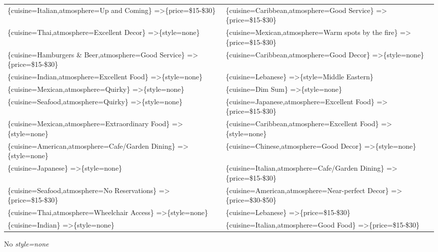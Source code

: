 \documentclass[letterpaper,10pt]{article}
\begin{document}
\begin{appendices}
\begin{table}[h]
\begin{adjustbox}{max width=\textwidth}
\begin{tabular}{ll}
\{cuisine=Italian,atmosphere=Up and Coming\} =\textgreater \{price=\$15-\$30\} & \{cuisine=Caribbean,atmosphere=Good Service\} =\textgreater \{price=\$15-\$30\} \\ 
\{cuisine=Thai,atmosphere=Excellent Decor\} =\textgreater \{style=none\} & \{cuisine=Mexican,atmosphere=Warm spots by the fire\} =\textgreater \{price=\$15-\$30\} \\ 
\{cuisine=Hamburgers \& Beer,atmosphere=Good Service\} =\textgreater \{price=\$15-\$30\} & \{cuisine=Caribbean,atmosphere=Good Decor\} =\textgreater \{style=none\} \\ 
\{cuisine=Indian,atmosphere=Excellent Food\} =\textgreater \{style=none\} & \{cuisine=Lebanese\} =\textgreater \{style=Middle Eastern\} \\ 
\{cuisine=Mexican,atmosphere=Quirky\} =\textgreater \{style=none\} & \{cuisine=Dim Sum\} =\textgreater \{style=none\} \\ 
\{cuisine=Seafood,atmosphere=Quirky\} =\textgreater \{style=none\} & \{cuisine=Japanese,atmosphere=Excellent Food\} =\textgreater \{price=\$15-\$30\} \\ 
\{cuisine=Mexican,atmosphere=Extraordinary Food\} =\textgreater \{style=none\} & \{cuisine=Caribbean,atmosphere=Excellent Food\} =\textgreater \{style=none\} \\ 
\{cuisine=American,atmosphere=Cafe/Garden Dining\} =\textgreater \{style=none\} & \{cuisine=Chinese,atmosphere=Good Decor\} =\textgreater \{style=none\} \\ 
\{cuisine=Japanese\} =\textgreater \{style=none\} & \{cuisine=Italian,atmosphere=Cafe/Garden Dining\} =\textgreater \{price=\$15-\$30\} \\ 
\{cuisine=Seafood,atmosphere=No Reservations\} =\textgreater \{price=\$15-\$30\} & \{cuisine=American,atmosphere=Near-perfect Decor\} =\textgreater \{price=\$30-\$50\} \\ 
\{cuisine=Thai,atmosphere=Wheelchair Access\} =\textgreater \{style=none\} & \{cuisine=Lebanese\} =\textgreater \{price=\$15-\$30\} \\ 
\{cuisine=Indian\} =\textgreater \{style=none\} & \{cuisine=Italian,atmosphere=Good Food\} =\textgreater \{price=\$15-\$30\} \\ 
\end{tabular}
\end{adjustbox}
\end{table}
\begin{table}[h]
\caption*{No \textit{style=none}}
\begin{adjustbox}{max width=\textwidth}

\end{adjustbox}
\end{table}
\end{appendices}
\end{document}
